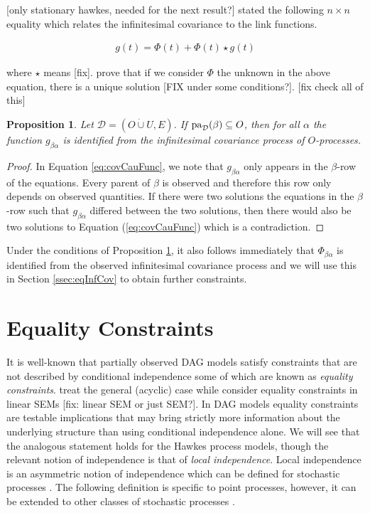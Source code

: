 \documentclass[accepted]{uai2021} %
\newtheorem{prop}[thm]{Proposition}
\newcommand{\pa}{\textnormal{pa}}
\newcommand{\disjU}{\mathbin{\dot{\cup}}}
\begin{document}
[only stationary hawkes, needed for the 
next result?] \cite{hawkesJRSSB1971} stated the following $n\times n$ equality 
which 
relates the infinitesimal covariance to the link functions.

\begin{align}
	g(t) = \Phi(t) + \Phi(t) \star g(t)
	\label{eq:covCauFunc}
\end{align}

where $\star$ means [fix]. \cite{bacry2016} prove that if we consider $\Phi$ 
the 
unknown in the above equation, there is a unique solution [FIX under some 
conditions?]. [fix check all of 
this] 

\begin{prop}
	Let $\mathcal{D} = (O\disjU U, E)$. If $\pa_\mathcal{D}(\beta) \subseteq 
	O$, then for all $\alpha$ the function $g_{\beta\alpha}$ is identified from 
	the infinitesimal covariance process of $O$-processes.
	\label{prop:gPaId}
\end{prop}

\begin{proof}
	In Equation \ref{eq:covCauFunc}, we note that $g_{\beta\alpha}$ only 
	appears in the $\beta$-row of the equations. Every parent of $\beta$ is 
	observed and therefore this row only depends on observed quantities. If 
	there were two solutions the equations in the $\beta$-row such that 
	$g_{\beta\alpha}$ differed between the two solutions, then there would also 
	be two solutions to Equation (\ref{eq:covCauFunc}) which is a contradiction.
\end{proof}

Under the conditions of Proposition \ref{prop:gPaId}, it also follows 
immediately that $\Phi_{\beta\alpha}$ is identified from the observed 
infinitesimal covariance process and we will use this in Section 
\ref{ssec:eqInfCov} to obtain further constraints.


\section{Equality Constraints}


It is well-known that partially observed DAG models satisfy 
constraints that 
are not described by conditional independence some of which are known as 
\emph{equality constraints}. \cite{richardson2017} treat the general (acyclic) 
case 
while \cite{chen2014, chenNIPS2016} consider equality constraints in linear 
SEMs [fix: linear SEM or 
just 
SEM?]. In DAG models equality constraints are testable implications that may 
bring strictly more information about the underlying structure than using 
conditional independence alone. We will see that the analogous statement holds 
for the Hawkes process models, though the relevant notion of independence is 
that of \emph{local independence}. Local independence is an asymmetric notion 
of independence which can be defined 
for stochastic processes \citep{schweder1970, aalen1987, didelez2000, 
didelez2008}. The following definition is specific to point processes, however, 
it can be extended to other classes of stochastic processes 
\citep{aalen1987,didelez2006,mogensenUAI2018,mogensen2018}.
\end{document}
